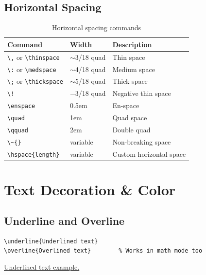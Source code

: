 \subsection{Horizontal Spacing}

\begin{table}[H]
\centering
\begin{tabular}{lll}
\toprule
\textbf{Command} & \textbf{Width} & \textbf{Description} \\
\midrule
\verb|\,|    or \verb|\thinspace|   & $\sim$3/18 quad & Thin space \\
\verb|\:|    or \verb|\medspace|    & $\sim$4/18 quad & Medium space \\
\verb|\;|    or \verb|\thickspace|  & $\sim$5/18 quad & Thick space \\
\verb|\!|                          & $-$3/18 quad    & Negative thin space \\
\verb|\enspace|                     & 0.5em           & En-space \\
\verb|\quad|                        & 1em             & Quad space \\
\verb|\qquad|                       & 2em             & Double quad \\
\verb|\~{}|                         & variable        & Non-breaking space \\
\verb|\hspace{length}|              & variable        & Custom horizontal space \\
\bottomrule
\end{tabular}
\caption{Horizontal spacing commands}
\end{table}

\section{Text Decoration \& Color}

\subsection{Underline and Overline}

\begin{lstlisting}[language={[LaTeX]TeX}, caption=Underline and overline]
\underline{Underlined text}
\overline{Overlined text}        % Works in math mode too
\end{lstlisting}

\underline{Underlined text example.}

